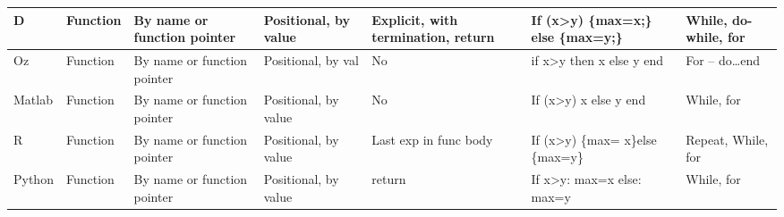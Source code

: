 \documentclass{sig-alternate}
\begin{document}
\begin{table}[]
\begin{tabular}{|l|l|l|l|l|l|l|}
D                  & Function                    & By name or function pointer & Positional, by value                  & Explicit, with termination, return                 & If (x\textgreater{}y) \{max=x;\} else \{max=y;\}     & While, do-while, for          \\ \hline
Oz                 & Function                    & By name or function pointer & Positional, by val                    & No                                                 & if x\textgreater{}y then x else y end                & For – do…end                  \\ \hline
Matlab             & Function                    & By name or function pointer & Positional, by value                  & No                                                 & If (x\textgreater{}y) x else y end                   & While, for                    \\ \hline
R                  & Function                    & By name or function pointer & Positional, by value                  & Last exp in func body                              & If (x\textgreater{}y) \{max= x\}else \{max=y\}       & Repeat, While, for            \\ \hline
Python             & Function                    & By name or function pointer & Positional, by value                  & return                                             & If x\textgreater{}y: max=x else: max=y               & While, for                    \\ \hline
\end{tabular}
\end{table}


\end{document}
